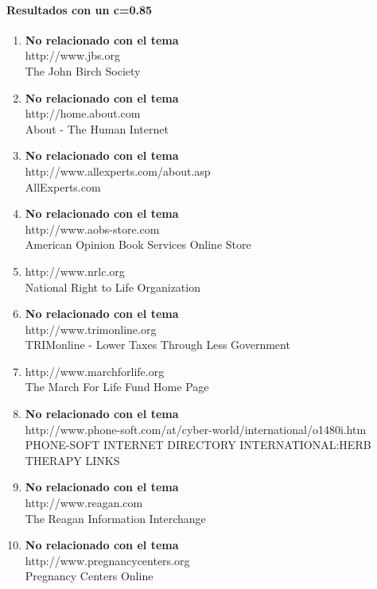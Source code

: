 \paragraph{Resultados con un c=0.85}
 \begin{enumerate}

 \item 
 \textbf{No relacionado con el tema}\\
 http://www.jbs.org\\
The John Birch Society
 \item 
 \textbf{No relacionado con el tema}\\
http://home.about.com\\
About - The Human Internet
 \item 
 \textbf{No relacionado con el tema}\\
http://www.allexperts.com/about.asp\\
AllExperts.com
 \item
  \textbf{No relacionado con el tema}\\
http://www.aobs-store.com\\
American Opinion Book Services Online Store
 \item
http://www.nrlc.org\\
National Right to Life Organization
 \item 
 \textbf{No relacionado con el tema}\\
http://www.trimonline.org\\
TRIMonline - Lower Taxes Through Less Government
 \item
http://www.marchforlife.org\\
The March For Life Fund Home Page
 \item 
 \textbf{No relacionado con el tema}\\
http://www.phone-soft.com/at/cyber-world/international/o1480i.htm\\
PHONE-SOFT INTERNET DIRECTORY INTERNATIONAL:HERB THERAPY LINKS
 \item 
\textbf{No relacionado con el tema}\\
http://www.reagan.com\\
The Reagan Information Interchange
 \item 
 \textbf{No relacionado con el tema}\\
http://www.pregnancycenters.org\\
Pregnancy Centers Online
 \end{enumerate}

